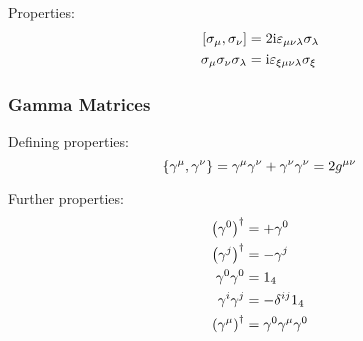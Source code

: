 		\noindent
		Properties:
		\begin{equation}
			\begin{aligned}
				\comm{\sigma_\mu}{\sigma_\nu} &= 2\i\varepsilon_{\mu\nu\lambda}\sigma_\lambda \\
				\sigma_\mu \sigma_\nu \sigma_\lambda &= \i\varepsilon_{\xi\mu\nu\lambda}\sigma_\xi \\
			\end{aligned}
		\end{equation}

		\subsubsection{Gamma Matrices}
			\noindent
			Defining properties:
			\begin{equation}
				\acomm{\gamma^\mu}{\gamma^\nu} = \gamma^\mu \gamma^\nu + \gamma^\nu \gamma^\nu = 2g^{\mu\nu}
			\end{equation}

			\noindent
			Further properties:
			\begin{equation}
				\begin{aligned}
					\qty(\gamma^0)^\dagger &= +\gamma^0 \\
					\qty(\gamma^j)^\dagger &= -\gamma^j \\
					\gamma^0 \gamma^0 &= 1_4 \\ %
					\gamma^i \gamma^j &= - \delta^{ij} 1_4 \\
					\qty(\gamma^\mu)^\dagger &= \gamma^0 \gamma^\mu \gamma^0 \\
				\end{aligned}
			\end{equation}

